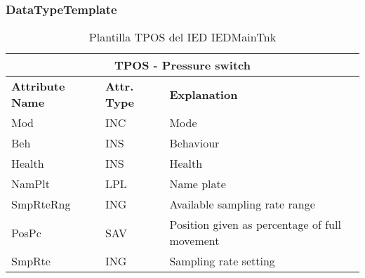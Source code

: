     \subsubsection{DataTypeTemplate}
    \begin{table}[H]
    \begin{center}
    \begin{tabular}{|l|l|p{8.5cm}|}
            \hline
            \multicolumn{3}{|c|}{\cellcolor[gray]{0.8} \textbf{ TPOS}  - Pressure switch} \\
            \hline
            \textbf{Attribute Name} & \textbf{Attr. Type} & \textbf{Explanation} \\
            \hline 
            Mod & INC & Mode \\
            \hline
            Beh & INS & Behaviour \\
            \hline
            Health & INS & Health \\
            \hline
            NamPlt & LPL & Name plate \\
            \hline
            SmpRteRng & ING & Available sampling rate range \\
            \hline
            PosPc & SAV & Position given as percentage of full movement \\
            \hline
            SmpRte & ING & Sampling rate setting \\
            \hline
    \end{tabular}
    \caption{Plantilla TPOS del IED IEDMainTnk}
    \label{table:lnTypeTPOS_prs_sw}
    \end{center}
    \end{table}
    
    
    